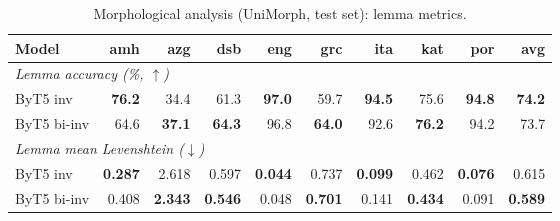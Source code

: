 \begin{table}[h]
\centering
\small
\setlength{\tabcolsep}{5pt}
\renewcommand{\arraystretch}{1.10}
\begin{tabular}{lrrrrrrrrr}
\toprule
Model & amh & azg & dsb & eng & grc & ita & kat & por & avg \\
\midrule
\multicolumn{10}{l}{\textit{Lemma accuracy (\%, $\uparrow$)}} \\
ByT5 inv & \textbf{76.2} & 34.4 & 61.3 & \textbf{97.0} & 59.7 & \textbf{94.5} & 75.6 & \textbf{94.8} & \textbf{74.2} \\
ByT5 bi-inv & 64.6 & \textbf{37.1} & \textbf{64.3} & 96.8 & \textbf{64.0} & 92.6 & \textbf{76.2} & 94.2 & 73.7 \\
\midrule
\multicolumn{10}{l}{\textit{Lemma mean Levenshtein ($\downarrow$)}} \\
ByT5 inv & \textbf{0.287} & 2.618 & 0.597 & \textbf{0.044} & 0.737 & \textbf{0.099} & 0.462 & \textbf{0.076} & 0.615 \\
ByT5 bi-inv & 0.408 & \textbf{2.343} & \textbf{0.546} & 0.048 & \textbf{0.701} & 0.141 & \textbf{0.434} & 0.091 & \textbf{0.589} \\
\bottomrule
\end{tabular}
\caption{Morphological analysis (UniMorph, test set): lemma metrics.}
\label{tab:results-analysis-um-lemma-matrix}
\end{table}
